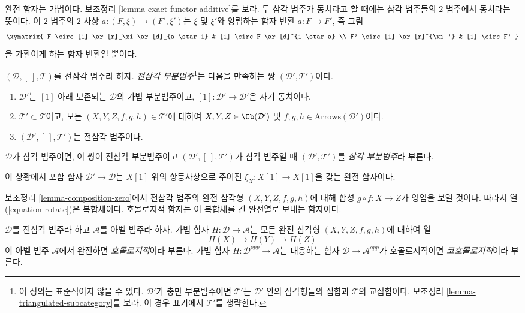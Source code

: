 \noindent
완전 함자는 가법이다. 보조정리 \ref{lemma-exact-functor-additive}를 보라.
두 삼각 범주가 동치라고 할 때에는 삼각 범주들의 $2$-범주에서 동치라는 뜻이다.
이 $2$-범주의 $2$-사상 $a : (F, \xi) \to (F', \xi')$는
$\xi$ 및 $\xi'$와 양립하는 함자 변환 $a : F \to F'$, 즉 그림
$$
\xymatrix{
F \circ [1] \ar[r]_\xi \ar[d]_{a \star 1} & [1] \circ F \ar[d]^{1 \star a} \\
F' \circ [1] \ar[r]^{\xi'} & [1] \circ F'
}
$$
을 가환이게 하는 함자 변환일 뿐이다.

\begin{definition}
\label{definition-triangulated-subcategory}
$(\mathcal{D}, [\ ], \mathcal{T})$를 전삼각 범주라 하자.
{\it 전삼각 부분범주}\footnote{이 정의는 표준적이지 않을 수 있다.
$\mathcal{D}'$가 충만 부분범주이면 $\mathcal{T}'$는
$\mathcal{D}'$ 안의 삼각형들의 집합과 $\mathcal{T}$의 교집합이다.
보조정리 \ref{lemma-triangulated-subcategory}를 보라.
이 경우 표기에서 $\mathcal{T}'$를 생략한다.}는 다음을 만족하는 쌍
$(\mathcal{D}', \mathcal{T}')$이다.
\begin{enumerate}
\item $\mathcal{D}'$는 $[1]$ 아래 보존되는 $\mathcal{D}$의 가법 부분범주이고,
$[1] : \mathcal{D}' \to \mathcal{D}'$은 자기 동치이다.
\item $\mathcal{T}' \subset \mathcal{T}$이고, 모든
$(X, Y, Z, f, g, h) \in \mathcal{T}'$에 대하여
$X, Y, Z \in \Ob(\mathcal{D}')$ 및
$f, g, h \in \text{Arrows}(\mathcal{D}')$이다.
\item $(\mathcal{D}', [\ ], \mathcal{T}')$는 전삼각 범주이다.
\end{enumerate}
$\mathcal{D}$가 삼각 범주이면, 이 쌍이 전삼각 부분범주이고
$(\mathcal{D}', [\ ], \mathcal{T}')$가 삼각 범주일 때
$(\mathcal{D}', \mathcal{T}')$를 {\it 삼각 부분범주}라 부른다.
\end{definition}

\noindent
이 상황에서 포함 함자 $\mathcal{D}' \to \mathcal{D}$는
$X[1]$ 위의 항등사상으로 주어진 $\xi_X : X[1] \to X[1]$을 갖는 완전 함자이다.

\medskip\noindent
보조정리 \ref{lemma-composition-zero}에서 전삼각 범주의 완전 삼각형
$(X, Y, Z, f, g, h)$에 대해 합성 $g \circ f : X \to Z$가 영임을 보일 것이다.
따라서 열 (\ref{equation-rotate})은 복합체이다. 호몰로지적 함자는 이 복합체를
긴 완전열로 보내는 함자이다.

\begin{definition}
\label{definition-homological}
$\mathcal{D}$를 전삼각 범주라 하고 $\mathcal{A}$를 아벨 범주라 하자.
가법 함자 $H : \mathcal{D} \to \mathcal{A}$는 모든 완전 삼각형
$(X, Y, Z, f, g, h)$에 대하여 열
$$
H(X) \to H(Y) \to H(Z)
$$
이 아벨 범주 $\mathcal{A}$에서 완전하면 {\it 호몰로지적}이라 부른다.
가법 함자 $H : \mathcal{D}^{opp} \to \mathcal{A}$는 대응하는 함자
$\mathcal{D} \to \mathcal{A}^{opp}$가 호몰로지적이면
{\it 코호몰로지적}이라 부른다.
\end{definition}

